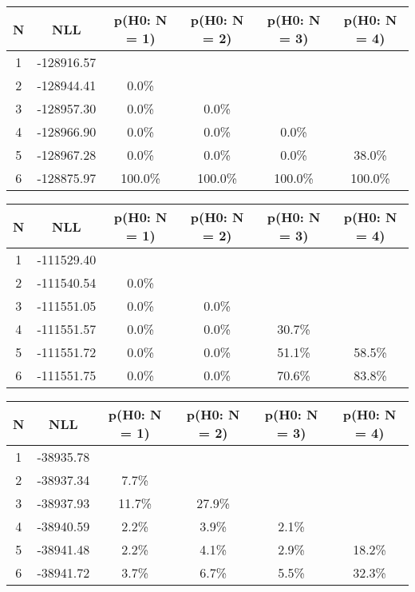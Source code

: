 \begin{table}[htb]
	\begin{center}
{\footnotesize\renewcommand{\arraystretch}{1.4}
		\begin{tabular}{cc||cccc}
			N & NLL & p(H0: N = 1) & p(H0: N = 2) & p(H0: N = 3) & p(H0: N = 4)\\ 
		\hline
1 & -128916.57 & & & & \\
2 & -128944.41 & 0.0\% & & & \\
3 & -128957.30 & 0.0\% & 0.0\% & & \\
4 & -128966.90 & 0.0\% & 0.0\% & 0.0\% & \\
5 & -128967.28 & 0.0\% & 0.0\% & 0.0\% & 38.0\% \\
6 & -128875.97 & 100.0\% & 100.0\% & 100.0\% & 100.0\% \\
	\end{tabular}
		\label{tab:lab}
	}
	\end{center}\end{table}

\begin{table}[htb]
	\begin{center}
{\footnotesize\renewcommand{\arraystretch}{1.4}
		\begin{tabular}{cc||cccc}
			N & NLL & p(H0: N = 1) & p(H0: N = 2) & p(H0: N = 3) & p(H0: N = 4)\\ 
		\hline
1 & -111529.40 & & & & \\
2 & -111540.54 & 0.0\% & & & \\
3 & -111551.05 & 0.0\% & 0.0\% & & \\
4 & -111551.57 & 0.0\% & 0.0\% & 30.7\% & \\
5 & -111551.72 & 0.0\% & 0.0\% & 51.1\% & 58.5\% \\
6 & -111551.75 & 0.0\% & 0.0\% & 70.6\% & 83.8\% \\
	\end{tabular}
		\label{tab:lab}
	}
	\end{center}\end{table}

\begin{table}[htb]
	\begin{center}
{\footnotesize\renewcommand{\arraystretch}{1.4}
		\begin{tabular}{cc||cccc}
			N & NLL & p(H0: N = 1) & p(H0: N = 2) & p(H0: N = 3) & p(H0: N = 4)\\ 
		\hline
1 & -38935.78 & & & & \\
2 & -38937.34 & 7.7\% & & & \\
3 & -38937.93 & 11.7\% & 27.9\% & & \\
4 & -38940.59 & 2.2\% & 3.9\% & 2.1\% & \\
5 & -38941.48 & 2.2\% & 4.1\% & 2.9\% & 18.2\% \\
6 & -38941.72 & 3.7\% & 6.7\% & 5.5\% & 32.3\% \\
	\end{tabular}
		\label{tab:lab}
	}
	\end{center}\end{table}

